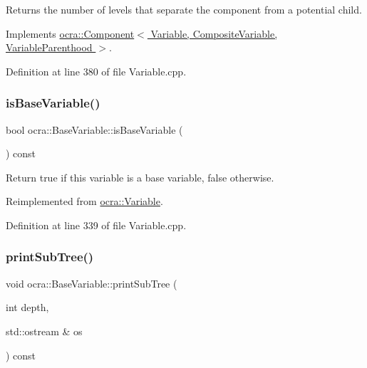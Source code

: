 Returns the number of levels that separate the component from a potential child. 



Implements \hyperlink{classocra_1_1Component_a8a0e052f36c60889562e921751b02a37}{ocra\+::\+Component$<$ Variable, Composite\+Variable, Variable\+Parenthood $>$}.



Definition at line 380 of file Variable.\+cpp.

\hypertarget{classocra_1_1BaseVariable_a454556cfc20026911bc687bc481ec95b}{}\label{classocra_1_1BaseVariable_a454556cfc20026911bc687bc481ec95b} 
\subsubsection{\texorpdfstring{is\+Base\+Variable()}{isBaseVariable()}}
{\footnotesize\ttfamily bool ocra\+::\+Base\+Variable\+::is\+Base\+Variable (\begin{DoxyParamCaption}{ }\end{DoxyParamCaption}) const\hspace{0.3cm}{\ttfamily [virtual]}}

Return true if this variable is a base variable, false otherwise. 

Reimplemented from \hyperlink{classocra_1_1Variable_a34c1b66c4dcf6b14181523a516a26951}{ocra\+::\+Variable}.



Definition at line 339 of file Variable.\+cpp.

\hypertarget{classocra_1_1BaseVariable_a4058b1accad9ff7b3d8995bdf9285fbd}{}\label{classocra_1_1BaseVariable_a4058b1accad9ff7b3d8995bdf9285fbd} 
\subsubsection{\texorpdfstring{print\+Sub\+Tree()}{printSubTree()}}
{\footnotesize\ttfamily void ocra\+::\+Base\+Variable\+::print\+Sub\+Tree (\begin{DoxyParamCaption}\item[{int}]{depth,  }\item[{std\+::ostream \&}]{os }\end{DoxyParamCaption}) const\hspace{0.3cm}{\ttfamily [virtual]}}



